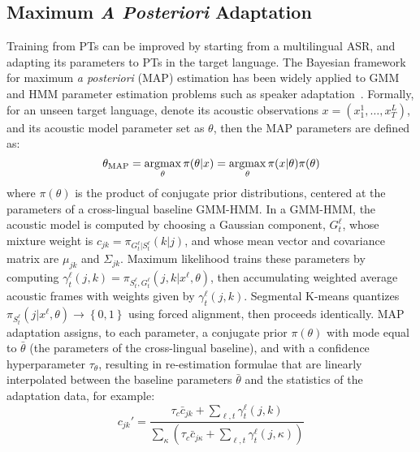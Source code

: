 \subsection{Maximum {\em A Posteriori} Adaptation}
\label{sec:adaptation}

Training from PTs can be improved by starting from a multilingual ASR,
and adapting its parameters to PTs in the target language.  The
Bayesian framework for maximum {\em a posteriori} (MAP) estimation
has been widely applied to GMM and HMM parameter estimation problems
such as speaker adaptation~\cite{gauvain1994maximum}.
Formally, for an unseen target language, denote its acoustic
observations $x = ( x_1^1, \ldots, x_{T}^L )$, and its acoustic model
parameter set as $\theta$, then the MAP parameters are defined as:
\begin{equation}
  \theta_{\mathrm{MAP}}  = \argmax_{\theta} \pi(\theta | x) 
= \argmax_{\theta} \pi( x | \theta ) \pi(\theta)
\label{eq:map}
\end{equation}
\noindent where $\pi(\theta)$ is the product of conjugate
prior distributions, centered at the parameters of a cross-lingual
baseline GMM-HMM.  In a GMM-HMM, the acoustic model 
is computed by choosing a Gaussian component, $G_t^\ell$, whose mixture
weight is $c_{jk}=\pi_{G_t^{\ell}|S_t^{\ell}}(k|j)$, and whose mean vector
and covariance matrix are $\mu_{jk}$ and $\Sigma_{jk}$.  Maximum
likelihood trains these parameters by computing
$\gamma^{\ell}_t(j,k)=\pi_{S_t^{\ell},G_t^{\ell}}(j,k|x^\ell,\theta)$,
then accumulating weighted average acoustic frames with weights given
by $\gamma_{t}^\ell(j,k)$. Segmental K-means quantizes
$\pi_{S_t^\ell}(j|x^\ell,\theta)\rightarrow\left\{0,1\right\}$ using forced
alignment, then proceeds identically.  MAP adaptation assigns, to each
parameter, a conjugate prior $\pi(\theta)$ with mode equal to
$\bar\theta$ (the parameters of the cross-lingual baseline), and with a
confidence hyperparameter $\tau_\theta$, resulting in re-estimation
formulae that are linearly interpolated between the baseline
parameters $\bar\theta$ and the statistics of the adaptation data, for
example:
\begin{equation}
c_{jk}'=\frac{\tau_c\bar{c}_{jk}+\sum_{\ell,t}\gamma_{t}^\ell(j,k)}
{\sum_{\kappa}\left(\tau_c\bar{c}_{j\kappa}+
  \sum_{\ell,t}\gamma_{t}^\ell(j,\kappa)\right)}
\end{equation}



